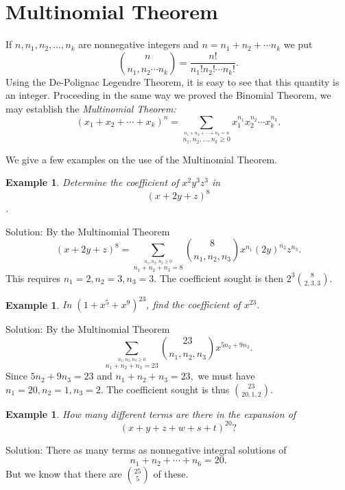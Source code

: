 \documentclass[11pt, openany]{book}
\theoremstyle{change} \theoremheaderfont{\blue\sffamily\bfseries}
\newtheorem{exa}[thm]{Example}
\theoremstyle{nonumberplain} \theoremheaderfont{\sffamily\bfseries}
\def\binom#1#2{{#1\choose#2}}
\newcommand{\í}{\'{\i}}
\begin{document}
\section{Multinomial Theorem} If $n, n_1 , n_2 ,
\ldots , n_k$ are nonnegative integers and $n = n_1 + n_2 + \cdots
n_k$ we put
$$ \binom{n}{n_1 , n_2  \cdots n_k } = \frac{n!}{n_1 ! n_2 ! \cdots n_k !}.$$Using the De-Polignac Legendre Theorem, it
is easy to see  that this quantity is an integer. Proceeding in
the same way we proved the Binomial Theorem, we may establish the
{\em Multinomial Theorem:}
$$ (x_1 + x_2 + \cdots + x_k )^n = \sum _{\stackrel{n_1 + n_2 + \cdots + n_k = n}{n_1 , n_ 2 , \ldots , n_k \geq 0}} x_1 ^{n_1}x_2 ^{n_2} \cdots x_k ^{n_k}.$$



We give a few examples on the use of the Multinomial Theorem.



\begin{exa} Determine the coefficient of $x^2 y^3 z^3$ in $$(x + 2y +
z)^8$$.\end{exa} Solution:  By the Multinomial Theorem  $$ (x + 2y
+ z)^{8} = \sum _{\stackrel{n_1, n_2, n_3 \geq 0}{n_1 + n_2 + n_3
= 8}} \binom{8}{n_1, n_2, n_3} x^{n_1}(2y)^{n_2}z^{n_3}.$$This
requires $n_1 = 2, n_2 = 3, n_3 = 3.$ The coefficient sought is
then $2^3 \binom{8}{2, 3, 3}.$
\begin{exa} In $(1 + x^5 + x^9)^{23}$, find the coefficient of
$x^{23}.$\end{exa} Solution:  By the Multinomial Theorem $$ \sum
_{\stackrel{n_1, n_2, n_3 \geq 0}{n_1 + n_2 + n_3 = 23}}
\binom{23}{n_1, n_2, n_3} x^{5n_2 + 9n_3}.$$Since $5n_2 + 9n_3 =
23$ and $n_1 + n_2 + n_3 = 23,$ we must have $n_1 = 20, n_2 = 1,
n_3 = 2.$ The coefficient sought is thus $\binom{23}{20, 1, 2}.$

\begin{exa} How many different terms are there in the expansion of $$ (x +
y + z + w + s + t)^{20} ?$$ \end{exa} Solution: There as many
terms as nonnegative integral solutions of $$ n_1 + n_2 + \cdots +
n_6 = 20.$$But we know that there are $\binom{25}{5}$ of these.
\end{document}
